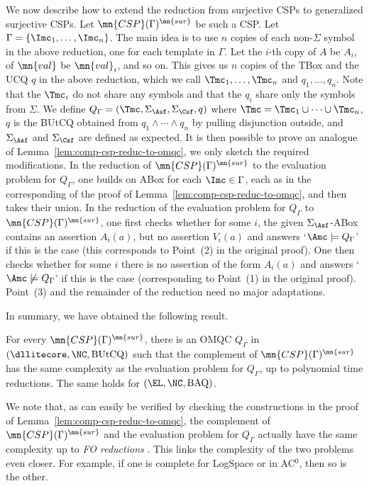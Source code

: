 \documentclass{lmcs}
\theoremstyle{definition}
\begin{document}
We now describe how to extend the reduction from surjective CSPs to
generalized surjective CSPs. Let $\mn{CSP}(\Gamma)^\mn{sur}$ be such a
CSP. Let $\Gamma = \{ \Imc_1,\dots,\Imc_n \}$. The main idea is to use
$n$ copies of each non-$\Sigma$ symbol in the above reduction, one for
each template in $\Gamma$.  Let the $i$-th copy of $A$ be $A_i$, of
$\mn{val}$ be $\mn{val}_i$, and so on. This gives us $n$ copies of the
TBox \Tmc and the UCQ $q$ in the above reduction, which we call
$\Tmc_1,\dots,\Tmc_n$ and $q_1,\dots,q_n$. Note that the $\Tmc_i$ do
not share any symbols and that the $q_i$ share only the symbols from
$\Sigma$. We define $Q_\Gamma=(\Tmc,\Sigma_\Asf,\Sigma_\Csf,q)$ where
$\Tmc = \Tmc_1 \cup \cdots \cup \Tmc_n$, $q$ is the BUtCQ obtained
from $q_1 \wedge \cdots \wedge q_n$ by pulling disjunction outside,
and $\Sigma_\Asf$ and $\Sigma_\Csf$ are defined as expected. It is
then possible to prove an analogue of
Lemma~\ref{lem:comp-csp-reduc-to-omqc}, we only sketch the required
modifications. In the reduction of $\mn{CSP}(\Gamma)^{\mn{sur}}$ to
the evaluation problem for $Q_{\Gamma}$, one builds on ABox \Amc for
each $\Imc \in \Gamma$, each as in the corresponding of the proof of
Lemma~\ref{lem:comp-csp-reduc-to-omqc}, and then takes their union.
In the reduction of the evaluation problem for $Q_{\Gamma}$ to
$\mn{CSP}(\Gamma)^{\mn{sur}}$, one first checks whether for some $i$,
the given $\Sigma_\Asf$-ABox \Amc contains an assertion $A_i(a)$, but
no assertion $V_i(a)$ and answers `$\Amc \models Q_\Gamma$' if this is
the case (this corresponds to Point~(2) in the original proof). One
then checks whether for some $i$ there is no assertion of the form
$A_i(a)$ and answers `$\Amc \not\models Q_\Gamma$' if this is
the case (corresponding to Point~(1) in the original proof). Point~(3)
and the remainder of the reduction need no major adaptations.

In summary, we have obtained the following result.
%
\begin{thm}
  \label{thn:cspfirstdir}
  For every $\mn{CSP}(\Gamma)^\mn{sur}$, %
  there is an OMQC $Q_{\Gamma}$ in  
  $(\dllitecore,\NC,\text{BUtCQ})$ such that the 
  complement of $\mn{CSP}(\Gamma)^\mn{sur}$ has the same complexity as 
  the evaluation problem for $Q_{\Gamma}$, up to polynomial time reductions. The same 
  holds for $(\EL,\NC,\text{BAQ})$.
\end{thm}
%
We note that, as can easily be verified by checking the
constructions in the proof of Lemma~\ref{lem:comp-csp-reduc-to-omqc},
the complement of $\mn{CSP}(\Gamma)^\mn{sur}$ and the evaluation problem 
for $Q_{\Gamma}$ actually have the same complexity up to \emph{FO reductions} 
\cite{Immerman}.  This links the complexity of the two problems even 
closer. For example, if one is complete for {\sc LogSpace} or in {\sc 
AC}$^0$, then so is the other.
\end{document}
